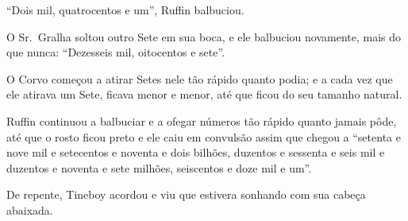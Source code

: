 ``Dois mil, quatrocentos e um'', Ruffin balbuciou.

O Sr.~Gralha soltou outro Sete em sua boca, e ele balbuciou novamente,
mais do que nunca: ``Dezesseis mil, oitocentos e sete''.

O Corvo começou a atirar Setes nele tão rápido quanto podia; e a cada
vez que ele atirava um Sete, ficava menor e menor, até que ficou do seu
tamanho natural.

Ruffin continuou a balbuciar e a ofegar números tão rápido quanto jamais
pôde, até que o rosto ficou preto e ele caiu em convulsão assim que
chegou a ``setenta e nove mil e setecentos e noventa e dois bilhões,
duzentos e sessenta e seis mil e duzentos e noventa e sete milhões,
seiscentos e doze mil e um''.

De repente, Tineboy acordou e viu que estivera sonhando com sua cabeça
abaixada.

